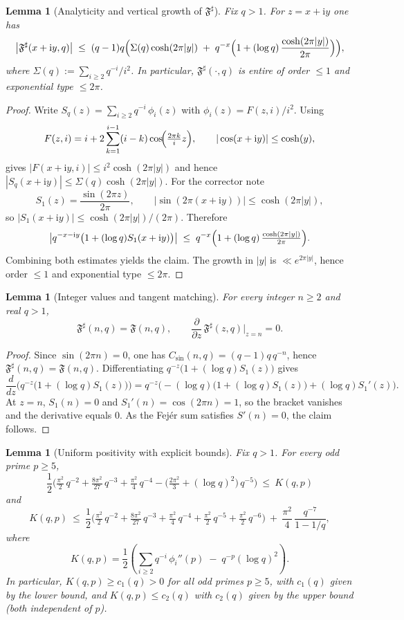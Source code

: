\documentclass[11pt,a4paper]{amsart}
\newcommand{\ii}{\mathrm{i}}
\newcommand{\Fbase}{\mathfrak F}
\newcommand{\Fsharp}{\Fbase^{\sharp}}
\theoremstyle{plain}
\newtheorem{lemma}[theorem]{Lemma}
\theoremstyle{definition}
\theoremstyle{remark}
\begin{document}
\begin{lemma}[Analyticity and vertical growth of $\Fsharp$]\label{lem:fsharp-growth-corrected}
Fix $q>1$. For $z=x+\ii y$ one has
\[
\bigl|\Fsharp(x+\ii y,q)\bigr|
\;\le\; (q-1)q\Bigl(\Sigma(q)\cosh(2\pi |y|)\;+\;q^{-x}\Bigl(1+(\log q)\,\frac{\cosh(2\pi|y|)}{2\pi}\Bigr)\Bigr),
\]
where $\Sigma(q):=\sum_{i\ge2}q^{-i}/i^2$. In particular, $\Fsharp(\cdot,q)$ is entire of order $\le 1$ and exponential type $\le 2\pi$.
\end{lemma}

\begin{proof}
Write $S_q(z)=\sum_{i\ge2}q^{-i}\,\phi_i(z)$ with $\phi_i(z)=F(z,i)/i^2$. Using
\[
F(z,i)=i+2\sum_{k=1}^{i-1}(i-k)\cos\!\Bigl(\tfrac{2\pi k}{i}z\Bigr),
\qquad
|\cos(x+\ii y)|\le \cosh(y),
\]
gives $|F(x+\ii y,i)|\le i^2\cosh(2\pi|y|)$ and hence $|S_q(x+\ii y)|\le \Sigma(q)\cosh(2\pi|y|)$.
For the corrector note
\[
S_1(z)=\frac{\sin(2\pi z)}{2\pi},
\qquad
|\sin(2\pi(x+\ii y))|\le \cosh(2\pi|y|),
\]
so $|S_1(x+\ii y)|\le \cosh(2\pi|y|)/(2\pi)$. Therefore
\[
\bigl|q^{-x-\ii y}\bigl(1+(\log q)S_1(x+\ii y)\bigr)\bigr|
\;\le\;q^{-x}\Bigl(1+(\log q)\,\tfrac{\cosh(2\pi|y|)}{2\pi}\Bigr).
\]
Combining both estimates yields the claim. The growth in $|y|$ is $\ll e^{2\pi|y|}$, hence order $\le 1$ and exponential type $\le 2\pi$.
\end{proof}

\begin{lemma}[Integer values and tangent matching]\label{lem:int-tangent}
For every integer $n\ge2$ and real $q>1$,
\[
\Fsharp(n,q)=\mathfrak F(n,q),\qquad
\frac{\partial}{\partial z}\,\Fsharp(z,q)\Big|_{z=n}=0.
\]
\end{lemma}
\begin{proof}
Since $\sin(2\pi n)=0$, one has $C_{\sin}(n,q)=(q-1)q\,q^{-n}$, hence $\Fsharp(n,q)=\mathfrak F(n,q)$. Differentiating $q^{-z}\bigl(1+(\log q)S_1(z)\bigr)$ gives
\[
\frac{d}{dz}\Big(q^{-z}\bigl(1+(\log q)S_1(z)\bigr)\Big)
=q^{-z}\Big(-(\log q)\bigl(1+(\log q)S_1(z)\bigr)+(\log q)S_1'(z)\Big).
\]
At $z=n$, $S_1(n)=0$ and $S_1'(n)=\cos(2\pi n)=1$, so the bracket vanishes and the derivative equals $0$. As the Fej\'er sum satisfies $S'(n)=0$, the claim follows.
\end{proof}

\begin{lemma}[Uniform positivity with explicit bounds]\label{lem:K-bounds}
Fix $q>1$. For every odd prime $p\ge5$,
\[
\frac{1}{2}\Big(\tfrac{\pi^2}{2}\,q^{-2}+\tfrac{8\pi^2}{27}\,q^{-3}+\tfrac{\pi^2}{4}\,q^{-4}-\big(\tfrac{2\pi^2}{3}+(\log q)^2\big)\,q^{-5}\Big)
\ \le\ K(q,p)
\]
and
\[
K(q,p)\ \le\ \frac{1}{2}\Big(\tfrac{\pi^2}{2}\,q^{-2}+\tfrac{8\pi^2}{27}\,q^{-3}+\tfrac{\pi^2}{4}\,q^{-4}+\tfrac{\pi^2}{2}\,q^{-5}+\tfrac{\pi^2}{2}\,q^{-6}\Big)\ +\ \frac{\pi^2}{4}\,\frac{q^{-7}}{1-1/q},
\]
where
\[
K(q,p)=\frac{1}{2}\left(\sum_{i\ge2} q^{-i}\,\phi_i''(p)\;-\;q^{-p}(\log q)^2\right).
\]
In particular, $K(q,p)\ge c_1(q)>0$ for all odd primes $p\ge5$, with $c_1(q)$ given by the lower bound, and $K(q,p)\le c_2(q)$ with $c_2(q)$ given by the upper bound (both independent of $p$).
\end{lemma}
\end{document}
